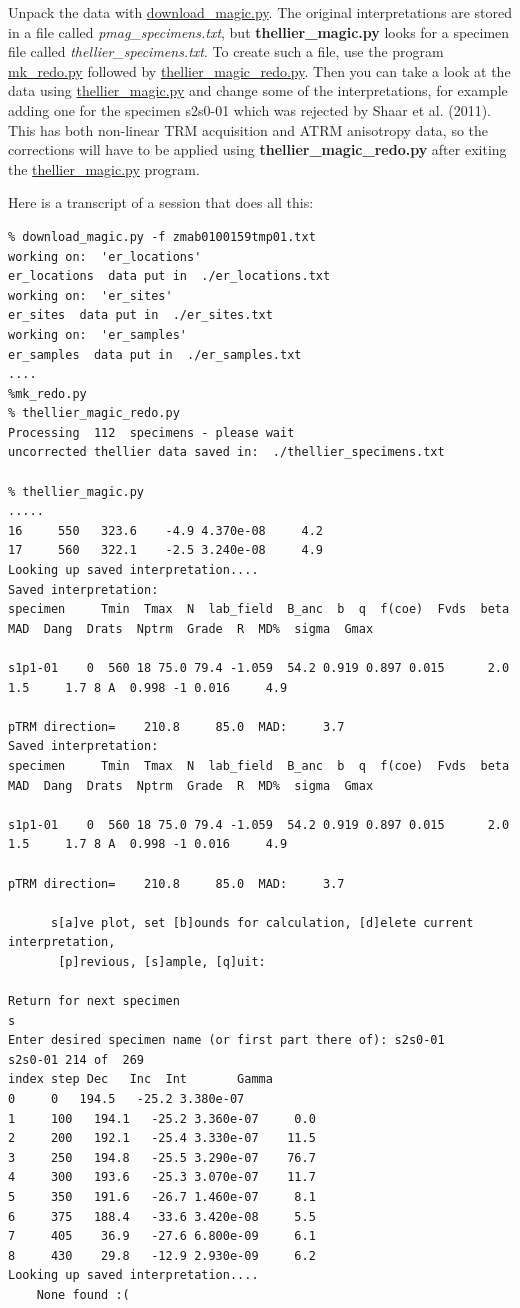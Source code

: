 \documentclass[11pt]{book}
\begin{document}
{Unpack the data with \href{#download_magic.py}{download\_magic.py}.   The original interpretations are stored in a file called {\it pmag\_specimens.txt}, but {\bf thellier\_magic.py} looks for a specimen file called {\it thellier\_specimens.txt}.  To create such a file, use the program \href{#mk_redo.py}{mk\_redo.py} followed by \href{#thellier_magic_redo.py}{thellier\_magic\_redo.py}.  Then you can take a look  at the data using \href{#thellier_magic.py}{thellier\_magic.py} and change some of the interpretations, for example adding one for the specimen s2s0-01 which was rejected by Shaar et al. (2011).   This has both non-linear TRM acquisition and ATRM anisotropy data, so the corrections will have to be applied using {\bf thellier\_magic\_redo.py} after exiting the \href{thellier_magic.py}{thellier\_magic.py} program.

Here is a transcript of a session that does all this:

\begin{verbatim}
% download_magic.py -f zmab0100159tmp01.txt
working on:  'er_locations'
er_locations  data put in  ./er_locations.txt
working on:  'er_sites'
er_sites  data put in  ./er_sites.txt
working on:  'er_samples'
er_samples  data put in  ./er_samples.txt
....
%mk_redo.py
% thellier_magic_redo.py
Processing  112  specimens - please wait
uncorrected thellier data saved in:  ./thellier_specimens.txt

% thellier_magic.py
.....
16     550   323.6    -4.9 4.370e-08     4.2
17     560   322.1    -2.5 3.240e-08     4.9
Looking up saved interpretation....
Saved interpretation:
specimen     Tmin  Tmax  N  lab_field  B_anc  b  q  f(coe)  Fvds  beta  MAD  Dang  Drats  Nptrm  Grade  R  MD%  sigma  Gmax

s1p1-01    0  560 18 75.0 79.4 -1.059  54.2 0.919 0.897 0.015      2.0     1.5     1.7 8 A  0.998 -1 0.016     4.9

pTRM direction=    210.8     85.0  MAD:     3.7
Saved interpretation:
specimen     Tmin  Tmax  N  lab_field  B_anc  b  q  f(coe)  Fvds  beta  MAD  Dang  Drats  Nptrm  Grade  R  MD%  sigma  Gmax

s1p1-01    0  560 18 75.0 79.4 -1.059  54.2 0.919 0.897 0.015      2.0     1.5     1.7 8 A  0.998 -1 0.016     4.9

pTRM direction=    210.8     85.0  MAD:     3.7

      s[a]ve plot, set [b]ounds for calculation, [d]elete current interpretation,
       [p]revious, [s]ample, [q]uit:

Return for next specimen
s
Enter desired specimen name (or first part there of): s2s0-01
s2s0-01 214 of  269
index step Dec   Inc  Int       Gamma
0     0   194.5   -25.2 3.380e-07
1     100   194.1   -25.2 3.360e-07     0.0
2     200   192.1   -25.4 3.330e-07    11.5
3     250   194.8   -25.5 3.290e-07    76.7
4     300   193.6   -25.3 3.070e-07    11.7
5     350   191.6   -26.7 1.460e-07     8.1
6     375   188.4   -33.6 3.420e-08     5.5
7     405    36.9   -27.6 6.800e-09     6.1
8     430    29.8   -12.9 2.930e-09     6.2
Looking up saved interpretation....
    None found :(


\end{verbatim}}
\end{document}

